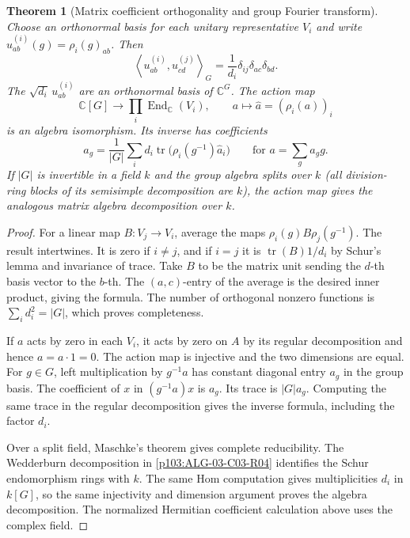 \documentclass[11pt,oneside,openany]{book}
\newtheorem{theorem}{Theorem}[chapter]
\theoremstyle{definition}
\theoremstyle{remark}
\begin{document}
\begin{theorem}[Matrix coefficient orthogonality and group Fourier transform]
\label{p103:ALG-07-C02-S02}
Choose an orthonormal basis for each unitary representative \(V_i\) and
write \(u^{(i)}_{ab}(g)=\rho_i(g)_{ab}\). Then
\[
 \left\langle u^{(i)}_{ab},u^{(j)}_{cd}\right\rangle_G
     =\frac{1}{d_i}\delta_{ij}\delta_{ac}\delta_{bd}.
\]
The \(\sqrt{d_i}\,u^{(i)}_{ab}\) are an orthonormal basis of
\(\mathbb C^G\). The action map
\[
 \mathbb C[G]\longrightarrow\prod_i\operatorname{End}_{\mathbb C}(V_i),
 \qquad a\longmapsto \widehat a=(\rho_i(a))_i
\]
is an algebra isomorphism. Its inverse has coefficients
\[
 a_g=\frac1{|G|}\sum_i d_i
       \operatorname{tr}\bigl(\rho_i(g^{-1})\widehat a_i\bigr)
       \qquad\text{for }a=\sum_g a_g g.
\]
If \(|G|\) is invertible in a field \(k\) and the group algebra splits
over \(k\) (all division-ring blocks of its semisimple decomposition
are \(k\)), the action map gives the analogous matrix algebra
decomposition over \(k\).
\end{theorem}

\begin{proof}
For a linear map \(B\colon V_j\to V_i\), average the maps
\(\rho_i(g)B\rho_j(g^{-1})\). The result intertwines. It is zero if
\(i\ne j\), and if \(i=j\) it is
\(\operatorname{tr}(B)1/d_i\) by Schur's lemma and invariance of trace.
Take \(B\) to be the matrix unit sending the \(d\)-th basis vector to
the \(b\)-th. The \((a,c)\)-entry of the average is the desired
inner product, giving the formula. The number of orthogonal
nonzero functions is \(\sum_i d_i^2=|G|\), which proves completeness.

If \(a\) acts by zero in each \(V_i\), it acts by zero on \(A\)
by its regular decomposition and hence \(a=a\cdot1=0\).
The action map is injective and the two dimensions are equal.
For \(g\in G\), left multiplication by \(g^{-1}a\) has constant
diagonal entry \(a_g\) in the group basis. The coefficient of \(x\)
in \((g^{-1}a)x\) is \(a_g\). Its trace is \(|G|a_g\). Computing
the same trace in the regular decomposition gives the inverse
formula, including the factor \(d_i\).

Over a split field, Maschke's theorem gives complete reducibility.
The Wedderburn decomposition in \ref{p103:ALG-03-C03-R04}
identifies the Schur endomorphism rings with \(k\). The same
Hom computation gives multiplicities \(d_i\) in \(k[G]\), so the same
injectivity and dimension argument proves the algebra decomposition.
The normalized Hermitian coefficient calculation above uses the
complex field.
\end{proof}
\end{document}

